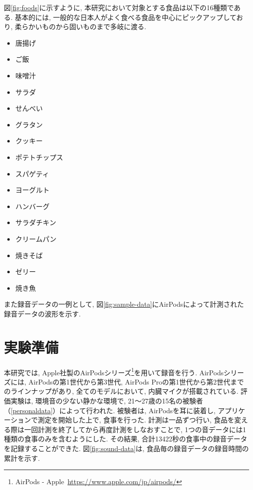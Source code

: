 図\ref{fig:foods}に示すように, 本研究において対象とする食品は以下の16種類である. 基本的には, 一般的な日本人がよく食べる食品を中心にピックアップしており, 柔らかいものから固いものまで多岐に渡る.

\begin{itemize}
    \item 唐揚げ
    \item ご飯
    \item 味噌汁
    \item サラダ
    \item せんべい
    \item グラタン
    \item クッキー
    \item ポテトチップス
    \item スパゲティ
    \item ヨーグルト
    \item ハンバーグ
    \item サラダチキン
    \item クリームパン
    \item 焼きそば
    \item ゼリー
    \item 焼き魚
\end{itemize}

また録音データの一例として, 図\ref{fig:sample-data}にAirPodsによって計測された録音データの波形を示す.

\section{実験準備}

本研究では, Apple社製のAirPodsシリーズ\footnote{AirPods - Apple~\url{https://www.apple.com/jp/airpods/}}を用いて録音を行う. AirPodsシリーズには, AirPodsの第1世代から第3世代, AirPods Proの第1世代から第2世代までのラインナップがあり, 全てのモデルにおいて, 内臓マイクが搭載されている. 評価実験は, 環境音の少ない静かな環境で, 21〜27歳の15名の被験者（\tablename\ref{personaldata}）によって行われた. 被験者は, AirPodsを耳に装着し, アプリケーションで測定を開始した上で, 食事を行った. 計測は一品ずつ行い, 食品を変える際は一回計測を終了してから再度計測をしなおすことで, 1つの音データには1種類の食事のみを含むようにした. その結果, 合計13422秒の食事中の録音データを記録することができた. 図\ref{fig:sound-data}は, 食品毎の録音データの録音時間の累計を示す.

